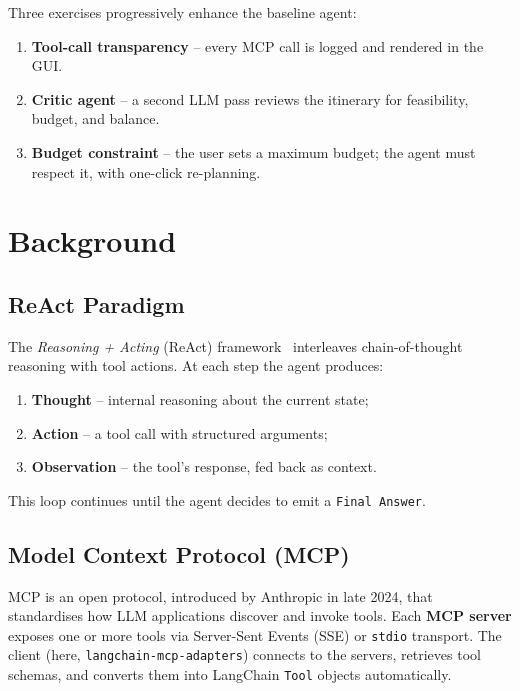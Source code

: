 \documentclass[12pt,a4paper]{article}
\begin{document}
Three exercises progressively enhance the baseline agent:
\begin{enumerate}[nosep]
  \item \textbf{Tool-call transparency} – every MCP call is logged and
        rendered in the GUI.
  \item \textbf{Critic agent} – a second LLM pass reviews the itinerary for
        feasibility, budget, and balance.
  \item \textbf{Budget constraint} – the user sets a maximum budget; the agent
        must respect it, with one-click re-planning.
\end{enumerate}

\section{Background}

\subsection{ReAct Paradigm}

The \emph{Reasoning + Acting} (ReAct) framework~\cite{yao2023react} interleaves
chain-of-thought reasoning with tool actions.  At each step the agent produces:
\begin{enumerate}[nosep]
  \item \textbf{Thought} – internal reasoning about the current state;
  \item \textbf{Action} – a tool call with structured arguments;
  \item \textbf{Observation} – the tool's response, fed back as context.
\end{enumerate}
This loop continues until the agent decides to emit a \texttt{Final Answer}.

\subsection{Model Context Protocol (MCP)}

MCP is an open protocol, introduced by Anthropic in late 2024, that
standardises how LLM applications discover and invoke tools.  Each
\textbf{MCP server} exposes one or more tools via Server-Sent Events (SSE)
or \texttt{stdio} transport.  The client (here, \texttt{langchain-mcp-adapters})
connects to the servers, retrieves tool schemas, and converts them into
LangChain \texttt{Tool} objects automatically.
\end{document}
